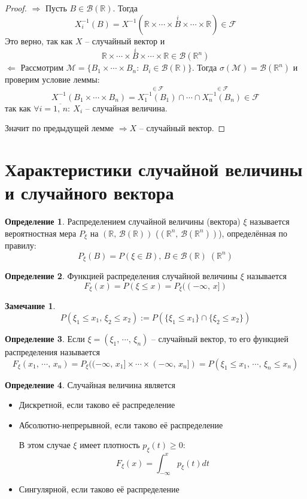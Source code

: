 \documentclass[a4paper,12pt]{article}
\renewcommand{\leq}{\ensuremath{\leqslant}}
\renewcommand{\geq}{\ensuremath{\geqslant}}
\theoremstyle{plain}
\theoremstyle{definition}
\newtheorem{definition}{Определение}[section]
\newtheorem*{note}{Замечание}
\theoremstyle{remark}
\begin{document}
\begin{proof}
  $\Rightarrow$ Пусть $B \in \mathcal{B}(\mathbb{R})$. Тогда 
  \[X_i^{-1}(B) = X^{-1}(\mathbb{R} \times\cdots\times \stackrel{i}{B}\times\cdots\times\mathbb{R}) \in \mathcal{F}\]
  Это верно, так как $X$ -- случайный вектор и 
  \[\mathbb{R} \times\cdots\times \stackrel{i}{B}\times\cdots\times \mathbb{R} \in \mathcal{B}(\mathbb{R}^n)\]
  $\Leftarrow$ Рассмотрим $\mathcal{M} = \{B_1\times\cdots\times B_n :\: B_i \in \mathcal{B}(\mathbb{R})\}$. Тогда $\sigma(\mathcal{M}) = \mathcal{B}(\mathbb{R}^n)$ и проверим условие леммы:
  \[X^{-1}(B_1\times\cdots\times B_n) = \stackrel{\in \mathcal{F}}{X^{-1}_1(B_1)} \cap\cdots\cap \stackrel{\in \mathcal{F}}{X_n^{-1}(B_n)} \in \mathcal{F}\]
  так как $\forall i = \overline{1,\,n}:\: X_i$ -- случайная величина.

  Значит по предыдущей лемме $\Rightarrow X$ -- случайный вектор.
\end{proof}

\section{Характеристики случайной величины и случайного вектора}
\begin{definition}
  Распределением случайной величины (вектора) $\xi$ называется вероятностная мера $P_\xi$ на $(\mathbb{R},\,\mathcal{B}(\mathbb{R}))$ ($(\mathbb{R}^n,\,\mathcal{B}(\mathbb{R}^n))$), определённая по правилу:
  \[P_\xi(B) = P(\xi \in B),\, B \in \mathcal{B}(\mathbb{R}) \; (\mathbb{R}^n)\]
\end{definition}

\begin{definition}
  Функцией распределения случайной величины $\xi$ называется
  \[F_\xi(x) = P(\xi \leq x) = P_\xi((-\infty,\, x])\]
\end{definition}

\begin{note}
  \[P(\xi_1 \leq x_1,\, \xi_2 \leq x_2) := P(\{\xi_1 \leq x_1\} \cap \{\xi_2 \leq x_2\})\]
\end{note}

\begin{definition}
  Если $\xi = (\xi_1,\,\cdots,\,\xi_n)$ -- случайный вектор, то его функцией распределения называется
  \[F_\xi(x_1,\,\cdots,\,x_n) = P_\xi((-\infty,\,x_1]\times\cdots\times (-\infty,\,x_n]) = P(\xi_1 \leq x_1,\, \cdots,\, \xi_n \leq x_n)\] 
\end{definition}

\begin{definition}
  Случайная величина является 
  \begin{itemize}
    \item Дискретной, если таково её распределение
    \item Абсолютно-непрерывной, если таково её распределение
    
    В этом случае $\xi$ имеет плотность $p_\xi(t) \geq 0$:
    \[F_\xi(x) = \int_{-\infty}^x p_\xi(t)dt\]
    \item Сингулярной, если таково её распределение
  \end{itemize}
\end{definition}
\end{document}
